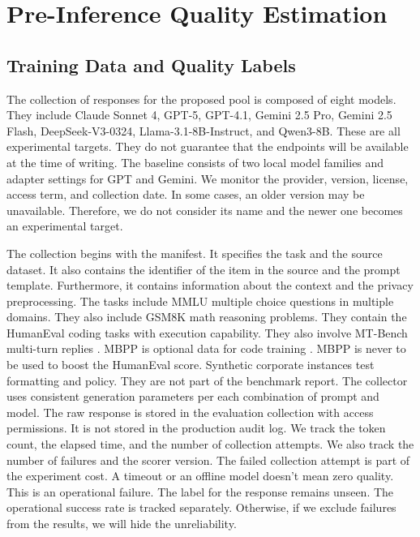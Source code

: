 \documentclass{FastFyp}
\begin{document}
\section{Pre-Inference Quality Estimation}
\label{sec:stage3-quality}
\subsection{Training Data and Quality Labels}
The collection of responses for the proposed pool is composed of eight models.
They include Claude Sonnet 4, GPT-5, GPT-4.1, Gemini 2.5 Pro, Gemini 2.5 Flash, DeepSeek-V3-0324, Llama-3.1-8B-Instruct, and Qwen3-8B.
These are all experimental targets.
They do not guarantee that the endpoints will be available at the time of writing.
The baseline consists of two local model families and adapter settings for GPT and Gemini.
We monitor the provider, version, license, access term, and collection date.
In some cases, an older version may be unavailable.
Therefore, we do not consider its name and the newer one becomes an experimental target.

The collection begins with the manifest.
It specifies the task and the source dataset.
It also contains the identifier of the item in the source and the prompt template.
Furthermore, it contains information about the context and the privacy preprocessing.
The tasks include MMLU multiple choice questions in multiple domains.
They also include GSM8K math reasoning problems.
They contain the HumanEval coding tasks with execution capability.
They also involve MT-Bench multi-turn replies \cite{ref:MMLU,ref:GSM8K,ref:HumanEval,ref:MTBench}.
MBPP is optional data for code training \cite{ref:MBPP}.
MBPP is never to be used to boost the HumanEval score.
Synthetic corporate instances test formatting and policy.
They are not part of the benchmark report.
The collector uses consistent generation parameters per each combination of prompt and model.
The raw response is stored in the evaluation collection with access permissions.
It is not stored in the production audit log.
We track the token count, the elapsed time, and the number of collection attempts.
We also track the number of failures and the scorer version.
The failed collection attempt is part of the experiment cost.
A timeout or an offline model doesn't mean zero quality.
This is an operational failure.
The label for the response remains unseen.
The operational success rate is tracked separately.
Otherwise, if we exclude failures from the results, we will hide the unreliability.
\end{document}
